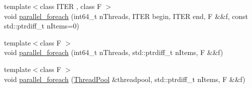 \begin{DoxyCompactItemize}
{\footnotesize template$<$class I\+T\+ER , class F $>$ }\\void \hyperlink{group__ParallelProcessing_gae081bc77f03a070b9fe0f97966949f58}{parallel\+\_\+foreach} (int64\+\_\+t n\+Threads, I\+T\+ER begin, I\+T\+ER end, F \&\&f, const std\+::ptrdiff\+\_\+t n\+Items=0)
\item 
{\footnotesize template$<$class F $>$ }\\void \hyperlink{group__ParallelProcessing_ga900cd2b90fda714e21082d5ba897f240}{parallel\+\_\+foreach} (int64\+\_\+t n\+Threads, std\+::ptrdiff\+\_\+t n\+Items, F \&\&f)
\item 
{\footnotesize template$<$class F $>$ }\\void \hyperlink{group__ParallelProcessing_gaf78ef995aaa44624da018033fd03beeb}{parallel\+\_\+foreach} (\hyperlink{classnifty_1_1parallel_1_1ThreadPool}{Thread\+Pool} \&threadpool, std\+::ptrdiff\+\_\+t n\+Items, F \&\&f)
\end{DoxyCompactItemize}
